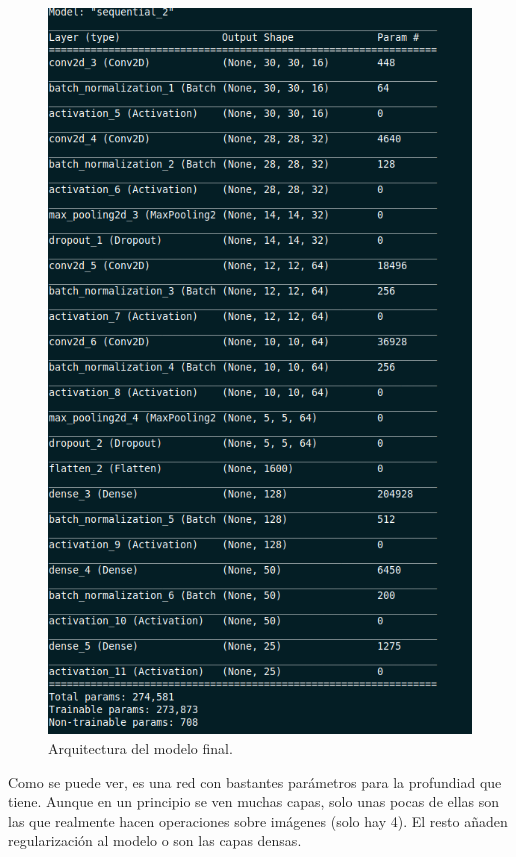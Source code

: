 \documentclass[11pt,a4paper]{article}
\begin{document}
\begin{figure}[H]
  \centering
  \includegraphics[scale=0.4]{img/final-model.png}
  \caption{Arquitectura del modelo final.}
  \label{fig:final-model}
\end{figure}

Como se puede ver, es una red con bastantes parámetros para la profundiad que tiene. Aunque en
un principio se ven muchas capas, solo unas pocas de ellas son las que realmente hacen operaciones
sobre imágenes (solo hay 4). El resto añaden regularización al modelo o son las capas densas.
\end{document}
